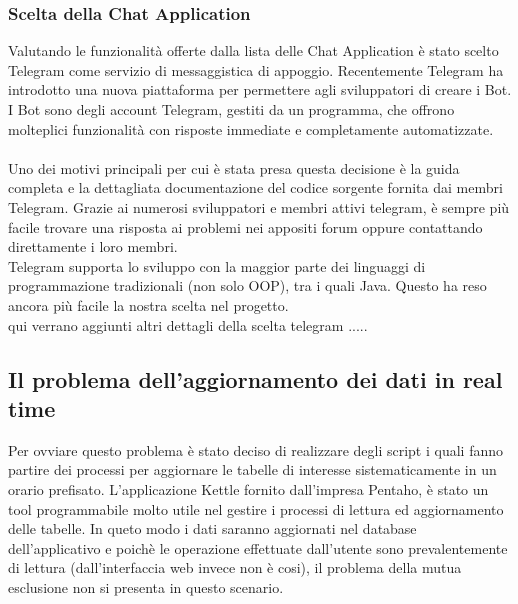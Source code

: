 \subsubsection{Scelta della Chat Application}
Valutando le funzionalità offerte dalla lista delle Chat Application è stato scelto Telegram come servizio di messaggistica di appoggio. Recentemente Telegram ha introdotto una nuova piattaforma per permettere agli sviluppatori di creare i Bot. I Bot sono degli account Telegram, gestiti da un programma, che offrono molteplici funzionalità con risposte immediate e completamente automatizzate. \\\\
Uno dei motivi principali per cui è stata presa questa decisione è la guida completa e la dettagliata documentazione del codice sorgente fornita dai membri Telegram. Grazie ai numerosi sviluppatori e membri attivi telegram, è sempre più facile trovare una risposta ai problemi nei appositi forum oppure contattando direttamente i loro membri.\\ Telegram supporta lo sviluppo con la maggior parte dei linguaggi di programmazione tradizionali (non solo OOP), tra i quali Java. Questo ha reso ancora più facile la nostra scelta nel progetto. \\

qui verrano aggiunti altri dettagli della scelta telegram .....


\subsection{Il problema dell'aggiornamento dei dati in real time}

Per ovviare questo problema è stato deciso di realizzare degli script i quali fanno partire dei processi per aggiornare le tabelle di interesse sistematicamente in un orario prefisato. L'applicazione Kettle fornito dall'impresa Pentaho, è stato un tool programmabile molto utile nel gestire i processi di lettura ed aggiornamento delle tabelle. In queto modo i dati saranno aggiornati nel database dell'applicativo e poichè le operazione effettuate dall'utente sono prevalentemente di lettura (dall'interfaccia web invece non è cosi), il problema della mutua esclusione  non si presenta in questo scenario. 

